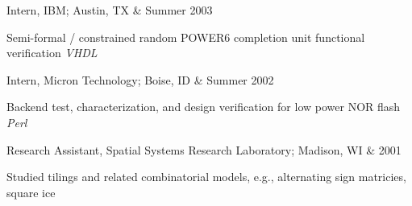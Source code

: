 \documentclass[letterpaper]{scrartcl}
\begin{document}
\begin{list1}
	\item \begin{tabular1bold} Intern, IBM; Austin, TX & Summer 2003 \end{tabular1bold}
	\begin{list2}
		\item Semi-formal / constrained random POWER6 completion unit functional verification \hfill \emph{VHDL}
	\end{list2}



	\item \begin{tabular1bold} Intern, Micron Technology; Boise, ID & Summer 2002 \end{tabular1bold}
	\begin{list2}
		\item Backend test, characterization, and design verification for low power NOR flash \hfill \emph{Perl}
	\end{list2}
	\item \begin{tabular1bold} Research Assistant, Spatial Systems Research Laboratory; Madison, WI & 2001 \end{tabular1bold}

	\begin{list2}
		\item Studied tilings and related combinatorial models, e.g., alternating sign matricies, square ice
	\end{list2}
\end{list1}
\end{document}
